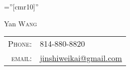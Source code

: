 \documentclass[a4paper,10pt]{article}
\begin{document}

\pagestyle{empty} %

\font\fb=''[cmr10]'' %

\par{\centering
		{\Huge Yan \textsc{Wang}
	}\bigskip\par}


\begin{tabular}{rl}
    \textsc{Phone:}     & 814-880-8820\\
    \textsc{email:}     & \href{mailto:jinshiweikai@gmail.com}{jinshiweikai@gmail.com}
\end{tabular}

\end{document}
